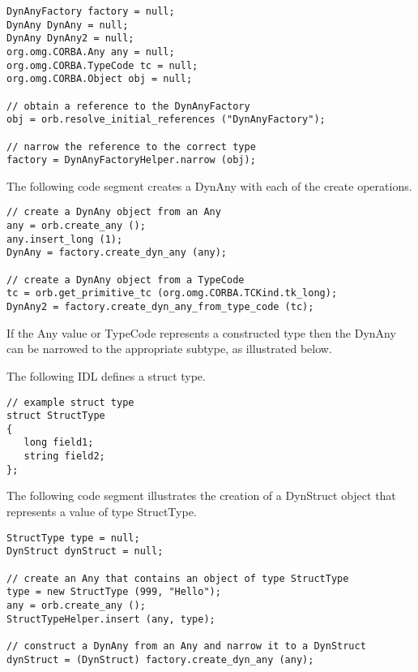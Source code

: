 \documentclass[12pt]{scrbook}
\begin{document}
\begin{small}
\begin{verbatim}
DynAnyFactory factory = null;
DynAny DynAny = null;
DynAny DynAny2 = null;
org.omg.CORBA.Any any = null;
org.omg.CORBA.TypeCode tc = null;
org.omg.CORBA.Object obj = null;

// obtain a reference to the DynAnyFactory
obj = orb.resolve_initial_references ("DynAnyFactory");

// narrow the reference to the correct type
factory = DynAnyFactoryHelper.narrow (obj);

\end{verbatim}
\end{small}

The following code segment creates a DynAny with each of the create
operations.

\begin{small}
\begin{verbatim}
// create a DynAny object from an Any
any = orb.create_any ();
any.insert_long (1);
DynAny = factory.create_dyn_any (any);

// create a DynAny object from a TypeCode
tc = orb.get_primitive_tc (org.omg.CORBA.TCKind.tk_long);
DynAny2 = factory.create_dyn_any_from_type_code (tc);

\end{verbatim}
\end{small}

If the Any value or TypeCode represents a constructed type then the
DynAny can be narrowed to the appropriate subtype, as illustrated
below.

The following IDL defines a struct type.

\begin{small}
\begin{verbatim}
// example struct type
struct StructType
{
   long field1;
   string field2;
};

\end{verbatim}
\end{small}

The following code segment illustrates the creation of a DynStruct
object that represents a value of type StructType.

\begin{small}
\begin{verbatim}
StructType type = null;
DynStruct dynStruct = null;

// create an Any that contains an object of type StructType
type = new StructType (999, "Hello");
any = orb.create_any ();
StructTypeHelper.insert (any, type);

// construct a DynAny from an Any and narrow it to a DynStruct
dynStruct = (DynStruct) factory.create_dyn_any (any);

\end{verbatim}
\end{small}
\end{document}
